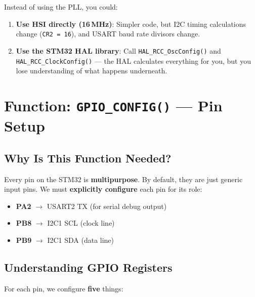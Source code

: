 \documentclass[12pt, a4paper]{article}
\begin{document}
\begin{altbox}
Instead of using the PLL, you could:
\begin{enumerate}[leftmargin=2em]
    \item \textbf{Use HSI directly (16\,MHz)}: Simpler code, but I2C timing calculations change (\texttt{CR2 = 16}), and USART baud rate divisors change.
    \item \textbf{Use the STM32 HAL library}: Call \texttt{HAL\_RCC\_OscConfig()} and \texttt{HAL\_RCC\_ClockConfig()} --- the HAL calculates everything for you, but you lose understanding of what happens underneath.
\end{enumerate}
\end{altbox}

\section{Function: \texttt{GPIO\_CONFIG()} --- Pin Setup}

\subsection{Why Is This Function Needed?}

Every pin on the STM32 is \textbf{multipurpose}. By default, they are just generic input pins. We must \textbf{explicitly configure} each pin for its role:

\begin{itemize}[leftmargin=2em]
    \item \textbf{PA2} $\rightarrow$ USART2 TX (for serial debug output)
    \item \textbf{PB8} $\rightarrow$ I2C1 SCL (clock line)
    \item \textbf{PB9} $\rightarrow$ I2C1 SDA (data line)
\end{itemize}

\subsection{Understanding GPIO Registers}

For each pin, we configure \textbf{five} things:
\end{document}
